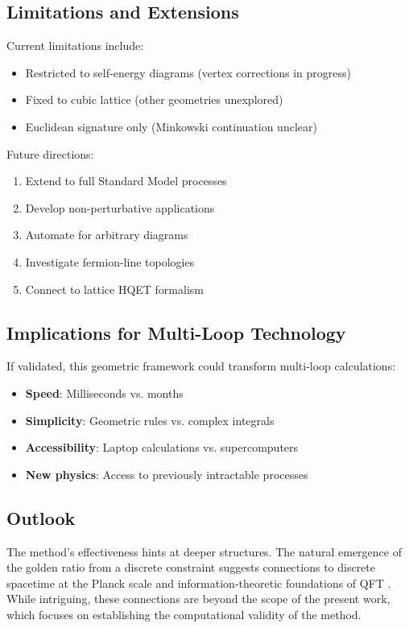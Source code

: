 \documentclass[11pt,a4paper]{article}
\theoremstyle{definition}
\theoremstyle{remark}
\begin{document}
\subsection{Limitations and Extensions}

Current limitations include:
\begin{itemize}
\item Restricted to self-energy diagrams (vertex corrections in progress)
\item Fixed to cubic lattice (other geometries unexplored)
\item Euclidean signature only (Minkowski continuation unclear)
\end{itemize}

Future directions:
\begin{enumerate}
\item Extend to full Standard Model processes
\item Develop non-perturbative applications
\item Automate for arbitrary diagrams
\item Investigate fermion-line topologies
\item Connect to lattice HQET formalism
\end{enumerate}

\subsection{Implications for Multi-Loop Technology}

If validated, this geometric framework could transform multi-loop calculations:
\begin{itemize}
\item \textbf{Speed}: Milliseconds vs. months
\item \textbf{Simplicity}: Geometric rules vs. complex integrals
\item \textbf{Accessibility}: Laptop calculations vs. supercomputers
\item \textbf{New physics}: Access to previously intractable processes
\end{itemize}

\subsection{Outlook}

The method's effectiveness hints at deeper structures. The natural emergence of the golden ratio from a discrete constraint suggests connections to discrete spacetime at the Planck scale \cite{Snyder1947,Rovelli2004,Ambjorn2012} and information-theoretic foundations of QFT \cite{Bousso2002,Susskind2016,Witten2018}. While intriguing, these connections are beyond the scope of the present work, which focuses on establishing the computational validity of the method.
\end{document}
